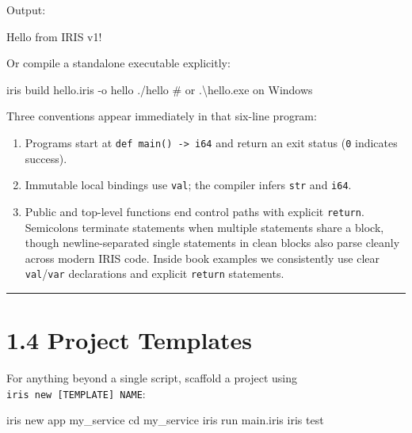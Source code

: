 \documentclass[
  english,
  oneside]{book}
\newenvironment{Shaded}{\begin{snugshade}}{\end{snugshade}}
\newcommand{\NormalTok}[1]{\textcolor[rgb]{0.83,0.83,0.83}{#1}}
\providecommand{\tightlist}{%
  \setlength{\itemsep}{0pt}\setlength{\parskip}{0pt}}
\begin{document}
Output:

\begin{Shaded}
\begin{Highlighting}[]
\NormalTok{Hello from IRIS v1!}
\end{Highlighting}
\end{Shaded}

Or compile a standalone executable explicitly:

\begin{Shaded}
\begin{Highlighting}[]
\NormalTok{iris build hello.iris {-}o hello}
\NormalTok{./hello        \# or .\textbackslash{}hello.exe on Windows}
\end{Highlighting}
\end{Shaded}

Three conventions appear immediately in that six-line program:

\begin{enumerate}
\def\labelenumi{\arabic{enumi}.}
\tightlist
\item
  Programs start at \texttt{def\ main()\ -\textgreater{}\ i64} and
  return an exit status (\texttt{0} indicates success).
\item
  Immutable local bindings use \texttt{val}; the compiler infers
  \texttt{str} and \texttt{i64}.
\item
  Public and top-level functions end control paths with explicit
  \texttt{return}. Semicolons terminate statements when multiple
  statements share a block, though newline-separated single statements
  in clean blocks also parse cleanly across modern IRIS code. Inside
  book examples we consistently use clear \texttt{val}/\texttt{var}
  declarations and explicit \texttt{return} statements.
\end{enumerate}

\begin{center}\rule{0.5\linewidth}{0.5pt}\end{center}

\section{1.4 Project Templates}\label{project-templates}

For anything beyond a single script, scaffold a project using
\texttt{iris\ new\ {[}TEMPLATE{]}\ NAME}:

\begin{Shaded}
\begin{Highlighting}[]
\NormalTok{iris new app my\_service}
\NormalTok{cd my\_service}
\NormalTok{iris run main.iris}
\NormalTok{iris test}
\end{Highlighting}
\end{Shaded}
\end{document}
